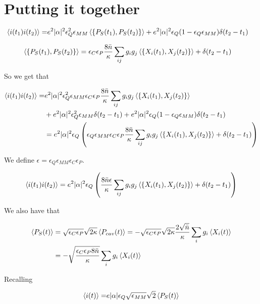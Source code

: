 \documentclass[12pt]{article}
\newcommand{\ep}{\epsilon}
\begin{document}
\section{Putting it together}

\begin{align}
\Braket{i(t_1)i(t_2)} =& e^2 |\alpha|^2 \epsilon_Q^2 \epsilon_{MM} \Braket{\left\{P_S(t_1), P_S(t_2)\right\}} + e^2|\alpha|^2 \epsilon_Q(1-\epsilon_Q\epsilon_{MM})\delta(t_2-t_1)
\end{align}

\begin{align}
\Braket{\left\{P_S(t_1),P_S(t_2)\right\}} &= \ep_C\ep_P \frac{8\bar{n}}{\kappa}\sum_{ij} g_ig_j\Braket{\left\{X_i(t_1),X_j(t_2)\right\}} + \delta(t_2-t_1)
\end{align}

So we get that

\begin{align}
\Braket{i(t_1)i(t_2)} =& e^2|\alpha|^2\ep_Q^2 \ep_{MM} \ep_C\ep_P \frac{8\bar{n}}{\kappa}\sum_{ij}g_ig_j\Braket{\left\{X_i(t_1),X_j(t_2)\right\}}\\
&+ e^2|\alpha|^2\ep_Q^2 \ep_{MM}\delta(t_2-t_1) + e^2|\alpha|^2\ep_Q(1-\ep_Q\ep_{MM})\delta(t_2-t_1)\\
&= e^2|\alpha|^2\ep_Q\left(\ep_Q\ep_{MM}\ep_C\ep_P \frac{8\bar{n}}{\kappa}\sum_{ij}g_ig_j\Braket{\left\{X_i(t_1),X_j(t_2)\right\}} + \delta(t_2-t_1)\right)
\end{align}

We define $\epsilon = \ep_Q\ep_{MM}\ep_C\ep_P$.

\begin{align}
\Braket{i(t_1)i(t_2)} = e^2|\alpha|^2\ep_Q\left(\frac{8\bar{n}\ep}{\kappa}\sum_{ij}g_ig_j \Braket{\left\{X_i(t_1),X_j(t_2)\right\}} + \delta(t_2-t_1) \right)
\end{align}

We also have that

\begin{align}
\Braket{P_S(t)} &= \sqrt{\ep_C\ep_P}\sqrt{2\kappa}\Braket{P_{cav}(t)} = -\sqrt{\ep_C\ep_P}\sqrt{2\kappa}\frac{2\sqrt{\bar{n}}}{\kappa}\sum_i g_i \Braket{X_i(t)}\\
&=-\sqrt{\frac{\ep_C\ep_P 8 \bar{n}}{\kappa}}\sum_i g_i\Braket{X_i(t)}
\end{align}

Recalling

\begin{align}
\braket{i(t)} = &e |\alpha|\epsilon_Q  \sqrt{\epsilon_{MM}}\sqrt{2}\Braket{P_{S}(t)}\\
\end{align}
\end{document}
